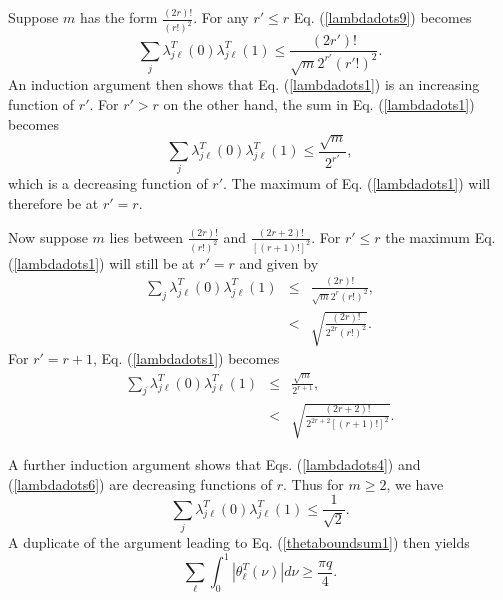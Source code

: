 \documentclass[12pt,amsmath,amssymb,onecolumn]{revtex4-2}
\begin{document}
Suppose $m$ has the form $\frac{(2r)!}{(r!)^2}$.
For any
$r' \le r$
Eq. (\ref{lambdadots9}) becomes
\begin{equation}
  \label{lambdadots1}
  \sum_j \lambda^T_{j \ell}(0) \lambda^T_{j \ell}(1) \le \frac{ (2 r')!}{\sqrt{m}2^{r'} (r'!)^2}.
\end{equation}
An induction argument then shows that Eq. (\ref{lambdadots1}) is an increasing
function of $r'$.
For $r' > r$ on the other hand, the sum in
Eq. (\ref{lambdadots1}) becomes
\begin{equation}
  \label{lambdadots2}
  \sum_j \lambda^T_{j \ell}(0) \lambda^T_{j \ell}(1) \le  \frac{ \sqrt{m}}{ 2^{r'}},
\end{equation}
which is a decreasing function of $r'$.
The maximum of Eq. (\ref{lambdadots1}) will therefore
be at $r' = r$.

Now suppose $m$ lies between $\frac{(2r)!}{(r!)^2}$ and $\frac{(2r + 2)!}{[(r+1)!]^2}$.
For $r' \le r$ the maximum Eq. (\ref{lambdadots1}) will still be at $r' = r$ and given by
\begin{subequations}
\begin{eqnarray}
  \label{lambdadots3}
  \sum_j \lambda^T_{j \ell}(0) \lambda^T_{j \ell}(1) & \le &  \frac{ (2 r)!}{\sqrt{m}2^{r} (r!)^2}, \\
      \label{lambdadots4}
      & < &\sqrt{ \frac{ (2 r)!}{2^{2r} (r!)^2}}.
\end{eqnarray}
\end{subequations}
For $r' = r + 1$, Eq. (\ref{lambdadots1}) becomes
\begin{subequations}
\begin{eqnarray}
  \label{lambdadots5}
  \sum_j \lambda^T_{j \ell}(0) \lambda^T_{j \ell}(1) & \le &   \frac{ \sqrt{m}}{ 2^{r+1}}, \\
  \label{lambdadots6}
& < & \sqrt{\frac{ (2 r+2)!}{2^{2r+2} [(r+1)!]^2}}.
\end{eqnarray}
\end{subequations}

A further induction argument shows that Eqs. (\ref{lambdadots4}) and (\ref{lambdadots6}) are
decreasing functions of $r$. 
Thus for $m \ge 2$,
we have
\begin{equation}
  \label{lambdadots7}
  \sum_j \lambda^T_{j \ell}(0) \lambda^T_{j \ell}(1) \le \frac{1}{\sqrt{2}}.
\end{equation}
A duplicate of the argument leading to Eq. (\ref{thetaboundsum1}) then
yields
\begin{equation}
\label{thetaboundsum5}
\sum_{\ell} \int_0^1 | \theta^T_{\ell}(\nu)| d \nu
\ge \frac{\pi q}{4}.
\end{equation}
\end{document}
